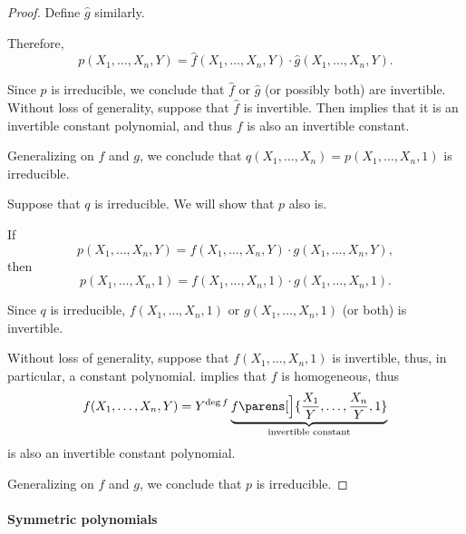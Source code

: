 \begin{proof}
  Define \( \widehat{g} \) similarly.

  Therefore,
  \begin{equation*}
    p(X_1, \ldots, X_n, Y) = \widehat f(X_1, \ldots, X_n, Y) \cdot \widehat g(X_1, \ldots, X_n, Y).
  \end{equation*}

  Since \( p \) is irreducible, we conclude that \( \widehat{f} \) or \( \widehat{g} \) (or possibly both) are invertible. Without loss of generality, suppose that \( \widehat{f} \) is invertible. Then  implies that it is an invertible constant polynomial, and thus \( f \) is also an invertible constant.

  Generalizing on \( f \) and \( g \), we conclude that \( q(X_1, \ldots, X_n) = p(X_1, \ldots, X_n, 1) \) is irreducible.

  \NecessitySubProof Suppose that \( q \) is irreducible. We will show that \( p \) also is.

  If
  \begin{equation*}
    p(X_1, \ldots, X_n, Y) = f(X_1, \ldots, X_n, Y) \cdot g(X_1, \ldots, X_n, Y),
  \end{equation*}
  then
  \begin{equation*}
    p(X_1, \ldots, X_n, 1) = f(X_1, \ldots, X_n, 1) \cdot g(X_1, \ldots, X_n, 1).
  \end{equation*}

  Since \( q \) is irreducible, \( f(X_1, \ldots, X_n, 1) \) or \( g(X_1, \ldots, X_n, 1) \) (or both) is invertible.

  Without loss of generality, suppose that \( f(X_1, \ldots, X_n, 1) \) is invertible, thus, in particular, a constant polynomial.  implies that \( f \) is homogeneous, thus
  \begin{equation*}
    f(X_1, \ldots, X_n, Y) = Y^{\deg f} \underbrace{f\parens[\Big]{ \frac {X_1} Y, \ldots, \frac {X_n} Y, 1 }}_{\T{invertible constant}}
  \end{equation*}
  is also an invertible constant polynomial.

  Generalizing on \( f \) and \( g \), we conclude that \( p \) is irreducible.
\end{proof}

\paragraph{Symmetric polynomials}

